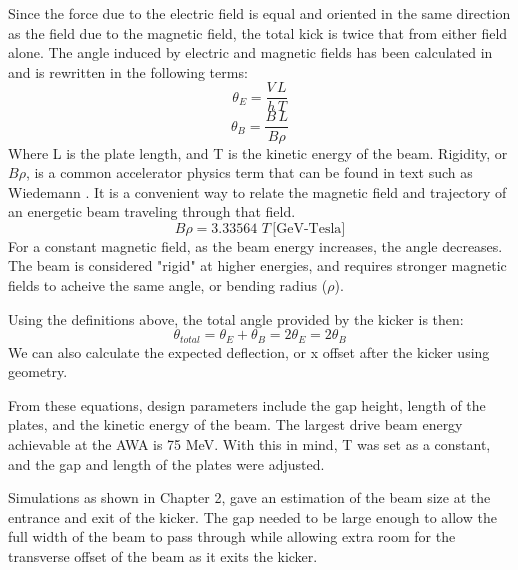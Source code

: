 Since the force due to the electric field is equal and oriented in the same direction as the field due to the magnetic field, 
the total kick is twice that from either field alone.  
The angle induced by electric and magnetic fields has been calculated in \cite{iukicker, Wiedemann}
and is rewritten in the following terms:  
\begin{equation}
\theta_E= \frac{V\,L}{h\,T}
\end{equation}
\begin{equation}
\theta_B= \frac{B\,L}{B\rho}
\end{equation}
Where L is the plate length, and T is the kinetic energy of the beam. 
Rigidity, or $B\rho$, is a common accelerator physics term that can be found in text such as Wiedemann \cite{Wiedemann}. 
It is a convenient way to relate the magnetic field and trajectory of an energetic beam traveling through that field.
\begin{equation}
	B\rho=3.33564\,\,T\, \text{[GeV-Tesla]}
\end{equation} 
For a constant magnetic field, as the beam energy increases, the angle decreases. 
The beam is considered "rigid" at higher energies, 
and requires stronger magnetic fields to acheive the same angle, or bending radius ($\rho$).

Using the definitions above, the total angle provided by the kicker is then: 
\begin{equation}
\theta_{total}= \theta_E+\theta_B=2\theta_E=2\theta_B
\end{equation}
We can also calculate the expected deflection, or x offset after the kicker 
using geometry. 


From these equations, design parameters include the gap height, length of the plates, and 
the kinetic energy of the beam. The largest drive beam energy achievable at the AWA is 75 MeV. 
With this in mind, T was set as a constant, and the gap and length of the plates were adjusted.


Simulations as shown in Chapter 2, gave an estimation of the beam size at the entrance and exit of the kicker.
The gap needed to be large enough to allow the full width of the beam to pass through while allowing extra room
for the transverse offset of the beam as it exits the kicker.




